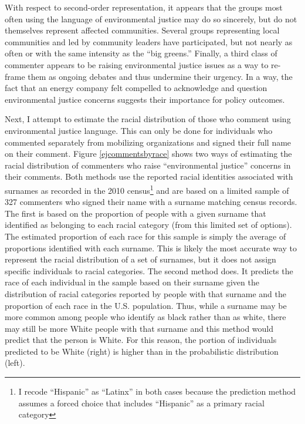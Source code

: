  With respect to second-order representation, it appears that the groups most often using the language of environmental justice may do so sincerely, but do not themselves represent affected communities. Several groups representing local communities and led by community leaders have participated, but not nearly as often or with the same intensity as the ``big greens.'' Finally, a third class of commenter appears to be raising environmental justice issues as a way to re-frame them as ongoing debates and thus undermine their urgency. In a way, the fact that an energy company felt compelled to acknowledge and question environmental justice concerns suggests their importance for policy outcomes.

Next, I attempt to estimate the racial distribution of those who comment using environmental justice language. This can only be done for individuals who commented separately from mobilizing organizations and signed their full name on their comment. 
Figure \ref{ejcommentsbyrace} shows two ways of estimating the racial distribution of commenters who raise ``environmental justice'' concerns in their comments. Both methods use the reported racial identities associated with surnames as recorded in the 2010 census\footnote{I recode ``Hispanic'' as ``Latinx'' in both cases because the prediction method assumes a forced choice that includes ``Hispanic'' as a primary racial category} and are based on a limited sample of 327 commenters who signed their name with a surname matching census records.  The first is based on the proportion of people with a given surname that identified as belonging to each racial category (from this limited set of options). The estimated proportion of each race for this sample is simply the average of proportions identified with each surname. This is likely the most accurate way to represent the racial distribution of a set of surnames, but it does not assign specific individuals to racial categories. The second method does. It predicts the race of each individual in the sample based on their surname given the distribution of racial categories reported by people with that surname and the proportion of each race in the U.S. population. Thus, while a surname may be more common among people who identify as black rather than as white, there may still be more White people with that surname and this method would predict that the person is White. For this reason, the portion of individuals predicted to be White (right) is higher than in the probabilistic distribution (left). 

